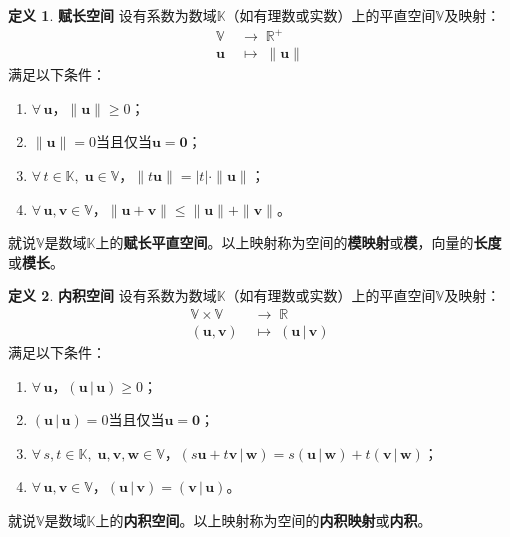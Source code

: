 \documentclass[12pt,UTF8]{ctexbook}
\newcommand{\nji}[2]{\displaystyle\left( #1 \,|\, #2\right)}
\theoremstyle{definition}
\newtheorem{df}{定义}[section]
\theoremstyle{plain}
\begin{document}
\begin{appendix}
\begin{df}{\textbf{赋长空间}}
    设有系数为数域$\mathbb{K}$（如有理数或实数）上的平直空间$\mathbb{V}$及映射：
    \begin{align*}
        \mathbb{V} \;&\rightarrow \;\mathbb{R}^+ \\
        \mathbf{u} \;&\mapsto \;\| \mathbf{u} \|
    \end{align*}
    满足以下条件：
    \begin{enumerate}
        \item $\forall \, \mathbf{u}$，$\|\mathbf{u}\| \geqslant 0$；
        \item $\| \mathbf{u} \| = 0$当且仅当$\mathbf{u} = \mathbf{0}$；
        \item $\forall \, t \in \mathbb{K}, \; \mathbf{u}\in \mathbb{V}$，$\| t\mathbf{u}\| = |t|\cdot \|\mathbf{u}\|$；
        \item $\forall \, \mathbf{u}, \mathbf{v} \in \mathbb{V}$，$\|\mathbf{u} + \mathbf{v}\| \leqslant \|\mathbf{u}\| + \|\mathbf{v}\|$。
    \end{enumerate}
    就说$\mathbb{V}$是数域$\mathbb{K}$上的\textbf{赋长平直空间}。以上映射称为空间的\textbf{模映射}或\textbf{模}，向量的\textbf{长度}或\textbf{模长}。
\end{df}

\begin{df}{\textbf{内积空间}}
    设有系数为数域$\mathbb{K}$（如有理数或实数）上的平直空间$\mathbb{V}$及映射：
    \begin{align*}
        \mathbb{V}\times \mathbb{V} \;&\rightarrow \;\mathbb{R} \\
        (\mathbf{u}, \mathbf{v}) \;&\mapsto \; \nji{\mathbf{u}}{\mathbf{v}}
    \end{align*}
    满足以下条件：
    \begin{enumerate}
        \item $\forall \, \mathbf{u}$，$\nji{\mathbf{u}}{\mathbf{u}} \geqslant 0$；
        \item $\nji{\mathbf{u}}{\mathbf{u}} = 0$当且仅当$\mathbf{u} = \mathbf{0}$；
        \item $\forall \, s, t \in \mathbb{K}, \; \mathbf{u}, \mathbf{v}, \mathbf{w}\in \mathbb{V}$，$\nji{s\mathbf{u} + t\mathbf{v}}{\mathbf{w}} = s\nji{\mathbf{u}}{\mathbf{w}} + t\nji{\mathbf{v}}{\mathbf{w}}$；
        \item $\forall \, \mathbf{u}, \mathbf{v} \in \mathbb{V}$，$\nji{\mathbf{u}}{\mathbf{v}} = \nji{\mathbf{v}}{\mathbf{u}}$。
    \end{enumerate}
    就说$\mathbb{V}$是数域$\mathbb{K}$上的\textbf{内积空间}。以上映射称为空间的\textbf{内积映射}或\textbf{内积}。
\end{df}


\end{appendix}
\end{document}

